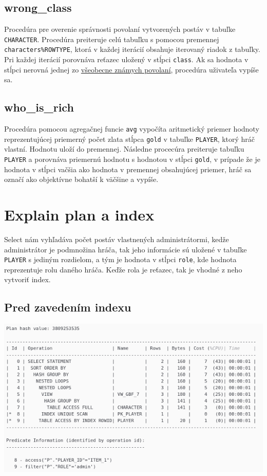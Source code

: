 \documentclass[a4paper,12pt,oneside]{article}
\begin{document}
\subsection{wrong\_class}
Procedúra pre overenie správnosti povolaní vytvorených postáv v tabuľke \texttt{CHARACTER}. Procedúra preiteruje celú tabuľku s pomocou premennej \texttt{characters\%ROWTYPE}, ktorá v každej iterácií obsahuje iterovaný riadok z tabuľky. Pri každej iterácií porovnáva reťazec uložený v stĺpci \texttt{class}. Ak sa hodnota v stĺpci nerovná jednej zo \href{https://www.dndbeyond.com/classes}{všeobecne známych povolaní}, procedúra uživateľa vypíše sa.

\subsection{who\_is\_rich}
Procedúra pomocou agregačnej funcie \texttt{avg} vypočíta aritmetický priemer hodnoty reprezentujúcej priemerný počet zlata stĺpca \texttt{gold} v tabuľke \texttt{PLAYER}, ktorý hráč vlastní. Hodnotu uloží do premennej. Následne procecúra preiteruje tabuľku \texttt{PLAYER} a porovnáva priemernú hodnotu s hodnotou v stĺpci \texttt{gold}, v prípade že je hodnota v stĺpci vačšia ako hodnota v premennej obsahujúcej priemer, hráč sa označí ako objektívne bohatší k väčšine a vypíše.

\section{Explain plan a index}
Select nám vyhľadáva počet postáv vlastnených administrátormi, kedže administrátor je podmnožina hráča, tak jeho informácie sú uložené v tabuľke \texttt{PLAYER} s jediným rozdielom, a tým je hodnota v stĺpci \texttt{role}, kde hodnota reprezentuje rolu daného hráča. Keďže rola je reťazec, tak je vhodné z neho vytvoriť index.

\subsection{Pred zavedením indexu}
\includegraphics[origin=c,scale=0.5]{explain}\\
\end{document}
